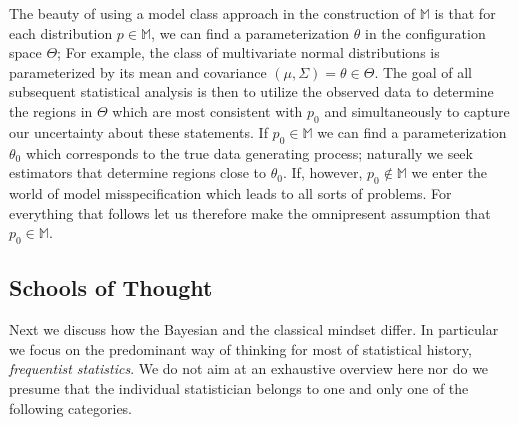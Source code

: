 The beauty of using a model class approach in the construction of $\mathbb{M}$ is that for each distribution $p \in \mathbb{M}$, we can find a parameterization $\theta$ in the configuration space $\Theta$; For example, the class of multivariate normal distributions is parameterized by its mean and covariance $(\mu, \Sigma) = \theta \in \Theta$.
The goal of all subsequent statistical analysis is then to utilize the observed data to determine the regions in $\Theta$ which are most consistent with $p_0$ and simultaneously to capture our uncertainty about these statements.
If $p_0 \in \mathbb{M}$ we can find a parameterization $\theta_0$ which corresponds to the true data generating process; naturally we seek estimators that determine regions close to $\theta_0$. If, however, $p_0 \not\in \mathbb{M}$ we enter the world of model misspecification which leads to all sorts of problems.
For everything that follows let us therefore make the omnipresent assumption that $p_0 \in \mathbb{M}$.

\subsection{Schools of Thought}
Next we discuss how the Bayesian and the classical mindset differ. In particular we focus on the predominant way of thinking for most of statistical history, \textit{frequentist statistics}. We do not aim at an exhaustive overview here nor do we presume that the individual statistician belongs to one and only one of the following categories.

